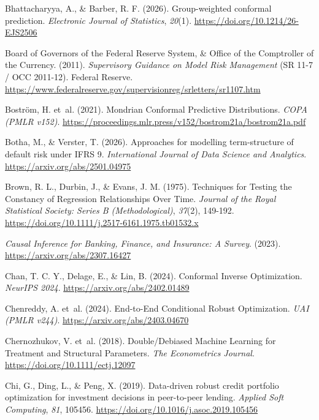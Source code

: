 \documentclass[
  spanish,
  11pt,
  letterpaper,
]{scrbook}
\newlength{\cslhangindent}
\newenvironment{CSLReferences}[2] %
 {\begin{list}{}{%
  \setlength{\itemindent}{0pt}
  \setlength{\leftmargin}{0pt}
  \setlength{\parsep}{0pt}
  \ifodd #1
   \setlength{\leftmargin}{\cslhangindent}
   \setlength{\itemindent}{-1\cslhangindent}
  \fi
  \setlength{\itemsep}{#2\baselineskip}}}
 {\end{list}}
\theoremstyle{plain}
\theoremstyle{remark}
\begin{document}
\begin{CSLReferences}{1}{0}
Bhattacharyya, A., \& Barber, R. F. (2026). Group-weighted conformal
prediction. \emph{Electronic Journal of Statistics}, \emph{20}(1).
\url{https://doi.org/10.1214/26-EJS2506}

Board of Governors of the Federal Reserve System, \& Office of the
Comptroller of the Currency. (2011). \emph{Supervisory Guidance on Model
Risk Management} (SR 11-7 / OCC 2011-12). Federal Reserve.
\url{https://www.federalreserve.gov/supervisionreg/srletters/sr1107.htm}

{Boström, H. et~al.} (2021). Mondrian Conformal Predictive
Distributions. \emph{COPA (PMLR v152)}.
\url{https://proceedings.mlr.press/v152/bostrom21a/bostrom21a.pdf}

Botha, M., \& Verster, T. (2026). Approaches for modelling
term-structure of default risk under {IFRS} 9. \emph{International
Journal of Data Science and Analytics}.
\url{https://arxiv.org/abs/2501.04975}

Brown, R. L., Durbin, J., \& Evans, J. M. (1975). Techniques for Testing
the Constancy of Regression Relationships Over Time. \emph{Journal of
the Royal Statistical Society: Series B (Methodological)}, \emph{37}(2),
149-192. \url{https://doi.org/10.1111/j.2517-6161.1975.tb01532.x}

\emph{Causal Inference for Banking, Finance, and Insurance: A Survey}.
(2023). \url{https://arxiv.org/abs/2307.16427}

Chan, T. C. Y., Delage, E., \& Lin, B. (2024). Conformal Inverse
Optimization. \emph{NeurIPS 2024}.
\url{https://arxiv.org/abs/2402.01489}

{Chenreddy, A. et~al.} (2024). End-to-End Conditional Robust
Optimization. \emph{UAI (PMLR v244)}.
\url{https://arxiv.org/abs/2403.04670}

{Chernozhukov, V. et~al.} (2018). Double/Debiased Machine Learning for
Treatment and Structural Parameters. \emph{The Econometrics Journal}.
\url{https://doi.org/10.1111/ectj.12097}

Chi, G., Ding, L., \& Peng, X. (2019). Data-driven robust credit
portfolio optimization for investment decisions in peer-to-peer lending.
\emph{Applied Soft Computing}, \emph{81}, 105456.
\url{https://doi.org/10.1016/j.asoc.2019.105456}


\end{CSLReferences}
\end{document}
